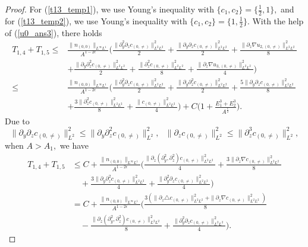 \documentclass[12pt, reqno]{amsart}
\numberwithin{equation}{section}
\begin{document}
\begin{proof}
		For (\ref{t13_temp1}), we use Young's inequality with $\{c_1,c_2\}=\{\frac{1}{2},1\},$ and 
		for (\ref{t13_temp2}), we use Young's inequality with $\{c_1,c_2\}=\{1,\frac12\}.$
		With the help of (\ref{u0_ans3}), 
		there holds
		\begin{equation*}
			\begin{aligned}
				T_{1,4}+T_{1,5}\leq& 
				\frac{\|n_{(0,0)}\|_{L^{\infty}L^1}}{A^{1-2\epsilon}}
				\Big(\frac{\|\partial_y^2\partial_zc_{(0,\neq)}\|^{2}_{L^2L^2}}{2}
				+\frac{\|\partial_y\partial_zc_{(0,\neq)}\|^{2}_{L^2L^2}}{2}
				+\frac{\|\partial_z\nabla u_{2,(0,\neq)}\|^{2}_{L^2L^2}}{8}\\&
				+\frac{\|\partial_y\partial_z^2c_{(0,\neq)}\|^{2}_{L^2L^2}}{2}
				+\frac{\|\partial_z^2c_{(0,\neq)}\|^{2}_{L^2L^2}}{8}
				+\frac{\|\partial_z\nabla u_{3,(0,\neq)}\|^{2}_{L^2L^2}}{4}\Big)\\
				\leq& 
				\frac{\|n_{(0,0)}\|_{L^{\infty}L^1}}{A^{1-2\epsilon}}
				\Big(\frac{\|\partial_y^2\partial_zc_{(0,\neq)}\|^{2}_{L^2L^2}}
				{2}
				+\frac{\|\partial_y\partial_z^2c_{(0,\neq)}\|^{2}_{L^2L^2}}{2}
				+\frac{5\|\partial_y\partial_zc_{(0,\neq)}\|^{2}_{L^2L^2}}{8}
				\\&
				+\frac{3 \|\partial_z^2c_{(0,\neq)}\|^{2}_{L^2L^2}}{8}
				+\frac{\|c_{(0,\neq)}\|^{2}_{L^2L^2}}{4}\Big)+C\Big(1+\frac{E_1^3+E_2^3}{A^{\frac{\epsilon}{2}}}\Big).
			\end{aligned}
		\end{equation*}
		Due to 
		$$\|\partial_y\partial_z c_{(0,\neq)}\|_{L^2}^2
		\leq \|\partial_y\partial_z^2 c_{(0,\neq)}\|_{L^2}^2,~~~
		\|\partial_z c_{(0,\neq)}\|_{L^2}^2
		\leq \|\partial_z^3 c_{(0,\neq)}\|_{L^2}^2,$$
		when $A>A_1,$ we have
		\begin{equation}\label{t14_1}
			\begin{aligned}
				T_{1,4}+T_{1,5}
				&\leq C+
				\frac{\|n_{(0,0)}\|_{L^{\infty}L^1}}{A^{1-2\epsilon}}
				\Big(\frac{\|\partial_z(\partial_y^2,\partial_z^2) c_{(0,\neq)}\|^{2}_{L^2L^2}}{4} 
				+\frac{3\|\partial_z\nabla c_{(0,\neq)}\|^{2}_{L^2L^2}}{8}\\
				&\quad +\frac{3\|\partial_y\partial_z^2 c_{(0,\neq)}\|^{2}_{L^2L^2}}{4}
				+\frac{\|\partial_y^2\partial_z c_{(0,\neq)}
					\|_{L^2L^2}^2}{4}\Big)\\
				&=C+
				\frac{\|n_{(0,0)}\|_{L^{\infty}L^1}}{A^{1-2\epsilon}}
				\Big(
				\frac{3(\|\partial_z\triangle c_{(0,\neq)}\|^{2}_{L^2L^2}	
					+\|\partial_z\nabla c_{(0,\neq)}\|^{2}_{L^2L^2})}{8}\\
				&\quad-\frac{\|\partial_z(\partial_y^2,\partial_z^2) c_{(0,\neq)}\|^{2}_{L^2L^2}}{8}
				+\frac{\|\partial_y^2\partial_z c_{(0,\neq)}\|_{L^2L^2}^2}{4} 
				\Big).
			\end{aligned}
		\end{equation}
		

\end{proof}
\end{document}
